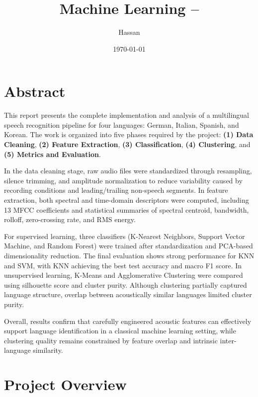 \documentclass[a4paper,14pt]{extarticle}
\author{Hassan}
\date{\today}
\title{Machine Learning -- \assignNum}
\begin{document}
\maketitle
\newpage
\tableofcontents

\newpage
\listoftables

\newpage
{}


\section*{Abstract}
\noindent
This report presents the complete implementation and analysis of a multilingual speech recognition pipeline for four languages: German, Italian, Spanish, and Korean. The work is organized into five phases required by the project: \textbf{(1) Data Cleaning}, \textbf{(2) Feature Extraction}, \textbf{(3) Classification}, \textbf{(4) Clustering}, and \textbf{(5) Metrics and Evaluation}. 

In the data cleaning stage, raw audio files were standardized through resampling, silence trimming, and amplitude normalization to reduce variability caused by recording conditions and leading/trailing non-speech segments. In feature extraction, both spectral and time-domain descriptors were computed, including 13 MFCC coefficients and statistical summaries of spectral centroid, bandwidth, rolloff, zero-crossing rate, and RMS energy. 

For supervised learning, three classifiers (K-Nearest Neighbors, Support Vector Machine, and Random Forest) were trained after standardization and PCA-based dimensionality reduction. The final evaluation shows strong performance for KNN and SVM, with KNN achieving the best test accuracy and macro F1 score. In unsupervised learning, K-Means and Agglomerative Clustering were compared using silhouette score and cluster purity. Although clustering partially captured language structure, overlap between acoustically similar languages limited cluster purity.

Overall, results confirm that carefully engineered acoustic features can effectively support language identification in a classical machine learning setting, while clustering quality remains constrained by feature overlap and intrinsic inter-language similarity.
\newpage

\section{Project Overview}
\end{document}
